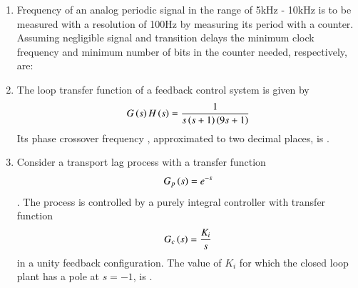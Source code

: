 \documentclass[journal,12pt,onecolumn]{IEEEtran}
\theoremstyle{remark}
\begin{document}
\begin{enumerate}
    \hfill{}
        \begin{enumerate}
        \end{enumerate}

    \item Frequency of an analog periodic signal in the range of 5kHz - 10kHz is to be measured with a resolution of 100Hz by measuring its period with a counter. Assuming negligible signal and transition delays the minimum clock frequency and minimum number of bits in the counter needed, respectively, are:

    \hfill{}
        \begin{enumerate}
        \end{enumerate}

    \item The loop transfer function of a feedback control system is given by $$G\left(s\right)H\left(s\right) = \frac{1}{s\left(s+1\right)\left(9s+1\right)}$$ Its phase crossover frequency , approximated to two decimal places, is \underline{\hspace{2cm}}.

    \hfill{}

    
    
    \item Consider a transport lag process with a transfer function $$G_p\left(s\right) = e^{-s}$$. The process is controlled by a purely integral controller with transfer function $$G_c\left(s\right) = \frac{K_i}{s}$$ in a unity feedback configuration. The value of $K_i$ for which the closed loop plant has a pole at $s = -1$, is \underline{\hspace{2cm}}.


\end{enumerate}
\end{document}
